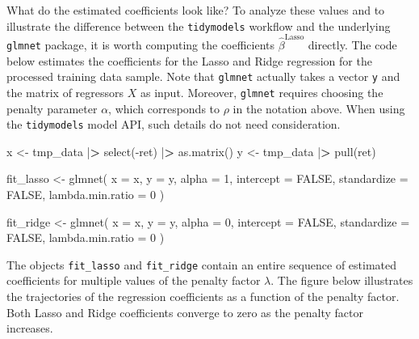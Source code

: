 \documentclass[
]{krantz}
\newenvironment{Shaded}{\begin{snugshade}}{\end{snugshade}}
\newcommand{\AttributeTok}[1]{\textcolor[rgb]{0.61,0.61,0.61}{#1}}
\newcommand{\ConstantTok}[1]{\textcolor[rgb]{0,0,0}{#1}}
\newcommand{\DecValTok}[1]{\textcolor[rgb]{0.06,0.06,0.06}{#1}}
\newcommand{\ErrorTok}[1]{\textcolor[rgb]{0.14,0.14,0.14}{\textbf{#1}}}
\newcommand{\FunctionTok}[1]{\textcolor[rgb]{0,0,0}{#1}}
\newcommand{\NormalTok}[1]{#1}
\newcommand{\OtherTok}[1]{\textcolor[rgb]{0.37,0.37,0.37}{#1}}
\newcommand{\SpecialCharTok}[1]{\textcolor[rgb]{0,0,0}{#1}}
\begin{document}
What do the estimated coefficients look like? To analyze these values and to illustrate the difference between the \texttt{tidymodels} workflow and the underlying \texttt{glmnet} package, it is worth computing the coefficients \(\hat\beta^\text{Lasso}\) directly. The code below estimates the coefficients for the Lasso and Ridge regression for the processed training data sample. Note that \texttt{glmnet} actually takes a vector \texttt{y} and the matrix of regressors \(X\) as input. Moreover, \texttt{glmnet} requires choosing the penalty parameter \(\alpha\), which corresponds to \(\rho\) in the notation above. When using the \texttt{tidymodels} model API, such details do not need consideration.

\begin{Shaded}
\begin{Highlighting}[]
\NormalTok{x }\OtherTok{\textless{}{-}}\NormalTok{ tmp\_data }\SpecialCharTok{|}\ErrorTok{\textgreater{}}
  \FunctionTok{select}\NormalTok{(}\SpecialCharTok{{-}}\NormalTok{ret) }\SpecialCharTok{|}\ErrorTok{\textgreater{}}
  \FunctionTok{as.matrix}\NormalTok{()}
\NormalTok{y }\OtherTok{\textless{}{-}}\NormalTok{ tmp\_data }\SpecialCharTok{|}\ErrorTok{\textgreater{}} \FunctionTok{pull}\NormalTok{(ret)}

\NormalTok{fit\_lasso }\OtherTok{\textless{}{-}} \FunctionTok{glmnet}\NormalTok{(}
  \AttributeTok{x =}\NormalTok{ x,}
  \AttributeTok{y =}\NormalTok{ y,}
  \AttributeTok{alpha =} \DecValTok{1}\NormalTok{,}
  \AttributeTok{intercept =} \ConstantTok{FALSE}\NormalTok{,}
  \AttributeTok{standardize =} \ConstantTok{FALSE}\NormalTok{,}
  \AttributeTok{lambda.min.ratio =} \DecValTok{0}
\NormalTok{)}

\NormalTok{fit\_ridge }\OtherTok{\textless{}{-}} \FunctionTok{glmnet}\NormalTok{(}
  \AttributeTok{x =}\NormalTok{ x,}
  \AttributeTok{y =}\NormalTok{ y,}
  \AttributeTok{alpha =} \DecValTok{0}\NormalTok{,}
  \AttributeTok{intercept =} \ConstantTok{FALSE}\NormalTok{,}
  \AttributeTok{standardize =} \ConstantTok{FALSE}\NormalTok{,}
  \AttributeTok{lambda.min.ratio =} \DecValTok{0}
\NormalTok{)}
\end{Highlighting}
\end{Shaded}

The objects \texttt{fit\_lasso} and \texttt{fit\_ridge} contain an entire sequence of estimated coefficients for multiple values of the penalty factor \(\lambda\). The figure below illustrates the trajectories of the regression coefficients as a function of the penalty factor. Both Lasso and Ridge coefficients converge to zero as the penalty factor increases.
\end{document}
